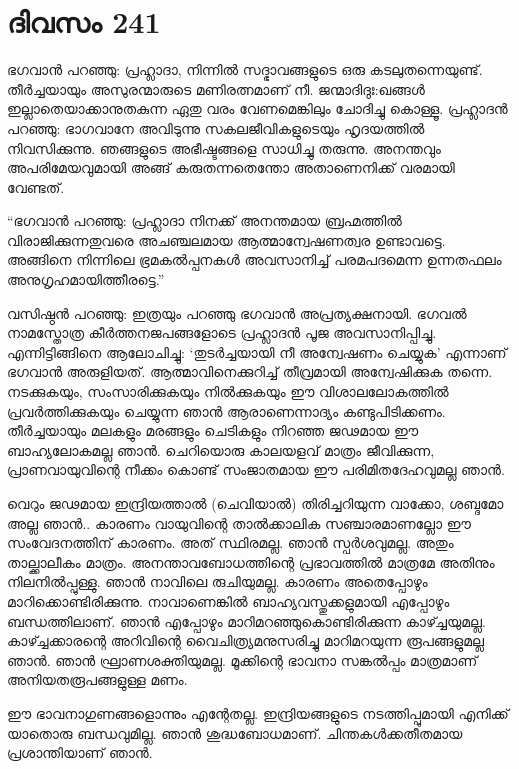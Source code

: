 \section{ദിവസം 241}


ഭഗവാന്‍ പറഞ്ഞു: പ്രഹ്ലാദാ, നിന്നില്‍ സദ്ഭാവങ്ങളുടെ ഒരു കടലുതന്നെയുണ്ട്. തീര്‍ച്ചയായും അസുരന്മാരുടെ മണിരത്നമാണ് നീ. ജന്മാദിദുഃ:ഖങ്ങള്‍ ഇല്ലാതെയാക്കാനുതകുന്ന  ഏതു വരം വേണമെങ്കിലും ചോദിച്ചു കൊള്ളൂ.
പ്രഹ്ലാദന്‍ പറഞ്ഞു: ഭാഗവാനേ അവിടുന്നു സകലജീവികളുടെയും ഹൃദയത്തില്‍ നിവസിക്കുന്നു. ഞങ്ങളുടെ അഭീഷ്ടങ്ങളെ സാധിച്ചു തരുന്നു. അനന്തവും അപരിമേയവുമായി അങ്ങ് കരുതന്നതെന്തോ അതാണെനിക്ക് വരമായി വേണ്ടത്.

“ഭഗവാന്‍ പറഞ്ഞു: പ്രഹ്ലാദാ നിനക്ക് അനന്തമായ ബ്രഹ്മത്തില്‍ വിരാജിക്കുന്നതുവരെ അചഞ്ചലമായ ആത്മാന്വേഷണത്വര ഉണ്ടാവട്ടെ. അങ്ങിനെ നിന്നിലെ ഭ്രമകല്‍പ്പനകള്‍ അവസാനിച്ച് പരമപദമെന്ന ഉന്നതഫലം അനുഗൃഹമായിത്തീരട്ടെ.”

വസിഷ്ഠന്‍ പറഞ്ഞു: ഇത്രയും പറഞ്ഞു ഭഗവാന്‍ അപ്രത്യക്ഷനായി. ഭഗവല്‍ നാമസ്തോത്ര കീര്‍ത്തനജപങ്ങളോടെ പ്രഹ്ലാദന്‍ പൂജ അവസാനിപ്പിച്ചു. എന്നിട്ടിങ്ങിനെ ആലോചിച്ചു: ‘തുടര്‍ച്ചയായി നീ അന്വേഷണം ചെയ്യുക’ എന്നാണ് ഭഗവാന്‍ അരുളിയത്. ആത്മാവിനെക്കുറിച്ച് തീവ്രമായി അന്വേഷിക്കുക തന്നെ. നടക്കുകയും, സംസാരിക്കുകയും നില്‍ക്കുകയും ഈ വിശാലലോകത്തില്‍ പ്രവര്‍ത്തിക്കുകയും ചെയ്യുന്ന ഞാന്‍ ആരാണെന്നാദ്യം കണ്ടുപിടിക്കണം. തീര്‍ച്ചയായും മലകളും മരങ്ങളും ചെടികളും നിറഞ്ഞ ജഢമായ ഈ ബാഹ്യലോകമല്ല ഞാന്‍. ചെറിയൊരു കാലയളവ്‌ മാത്രം ജീവിക്കുന്ന, പ്രാണവായുവിന്റെ നീക്കം കൊണ്ട് സംജാതമായ ഈ പരിമിതദേഹവുമല്ല ഞാന്‍.    

വെറും ജഢമായ ഇന്ദ്രിയത്താല്‍ (ചെവിയാല്‍) തിരിച്ചറിയുന്ന വാക്കോ, ശബ്ദമോ അല്ല ഞാന്‍..  കാരണം വായുവിന്റെ താല്‍ക്കാലിക സഞ്ചാരമാണല്ലോ ഈ സംവേദനത്തിന് കാരണം. അത് സ്ഥിരമല്ല. ഞാന്‍ സ്പര്‍ശവുമല്ല. അതും താല്ക്കാലീകം മാത്രം. അനന്താവബോധത്തിന്റെ പ്രഭാവത്തില്‍ മാത്രമേ അതിനും നിലനില്‍പ്പുള്ളു. ഞാന്‍ നാവിലെ രുചിയുമല്ല. കാരണം അതെപ്പോഴും മാറിക്കൊണ്ടിരിക്കുന്നു. നാവാണെങ്കില്‍ ബാഹ്യവസ്തുക്കളുമായി എപ്പോഴും ബന്ധത്തിലാണ്. ഞാന്‍ എപ്പോഴും മാറിമറഞ്ഞുകൊണ്ടിരിക്കുന്ന കാഴ്ച്ചയുമല്ല. കാഴ്ച്ചക്കാരന്റെ അറിവിന്റെ വൈചിത്ര്യമനുസരിച്ചു മാറിമറയുന്ന രൂപങ്ങളുമല്ല ഞാന്‍. ഞാന്‍ ഘ്രാണശക്തിയുമല്ല. മൂക്കിന്റെ ഭാവനാ സങ്കല്‍പ്പം മാത്രമാണ് അനിയതരൂപങ്ങളുള്ള മണം.

ഈ ഭാവനാഗുണങ്ങളൊന്നും എന്റേതല്ല. ഇന്ദ്രിയങ്ങളുടെ നടത്തിപ്പുമായി എനിക്ക് യാതൊരു ബന്ധവുമില്ല. ഞാന്‍ ശുദ്ധബോധമാണ്. ചിന്തകള്‍ക്കതീതമായ പ്രശാന്തിയാണ് ഞാന്‍.


